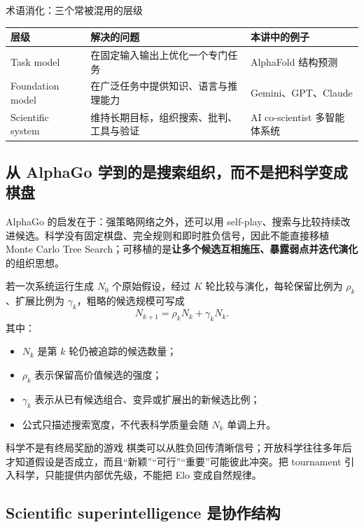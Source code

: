 \begin{knowledgebox}{术语消化：三个常被混用的层级}
\begin{tabular}{L{0.16\textwidth}L{0.31\textwidth}L{0.36\textwidth}}
\toprule
层级 & 解决的问题 & 本讲中的例子 \\
\midrule
Task model & 在固定输入输出上优化一个专门任务 & AlphaFold 结构预测 \\
Foundation model & 在广泛任务中提供知识、语言与推理能力 & Gemini、GPT、Claude \\
Scientific system & 维持长期目标，组织搜索、批判、工具与验证 & AI co-scientist 多智能体系统 \\
\bottomrule
\end{tabular}
\end{knowledgebox}

\subsection{从 AlphaGo 学到的是搜索组织，而不是把科学变成棋盘}

AlphaGo 的启发在于：强策略网络之外，还可以用 self-play、搜索与比较持续改进候选。科学没有固定棋盘、完全规则和即时胜负信号，因此不能直接移植 Monte Carlo Tree Search；可移植的是\textbf{让多个候选互相施压、暴露弱点并迭代演化}的组织思想。

若一次系统运行生成 $N_0$ 个原始假设，经过 $K$ 轮比较与演化，每轮保留比例为 $\rho_k$、扩展比例为 $\gamma_k$，粗略的候选规模可写成
$$
N_{k+1}=\rho_kN_k+\gamma_kN_k.
$$
其中：
\begin{itemize}
  \item $N_k$ 是第 $k$ 轮仍被追踪的候选数量；
  \item $\rho_k$ 表示保留高价值候选的强度；
  \item $\gamma_k$ 表示从已有候选组合、变异或扩展出的新候选比例；
  \item 公式只描述搜索宽度，不代表科学质量会随 $N_k$ 单调上升。
\end{itemize}

\begin{warningbox}{科学不是有终局奖励的游戏}
棋类可以从胜负回传清晰信号；开放科学往往多年后才知道假设是否成立，而且“新颖”“可行”“重要”可能彼此冲突。把 tournament 引入科学，只能提供内部优先级，不能把 Elo 变成自然规律。
\end{warningbox}

\subsection{Scientific superintelligence 是协作结构}

